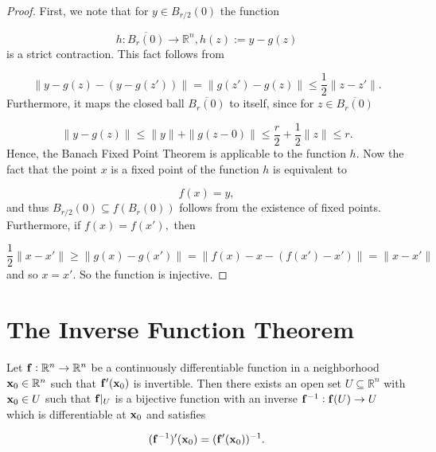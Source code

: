 \begin{proof}
First, we note that for \(y \in B_{r/2}(0)\) the function

\[h: \overline{B_r(0)} \to \mathbb R^n, h(z) := y - g(z)\] is a strict
contraction. This fact follows from

\[\|y - g(z) - (y - g(z'))\| = \|g(z') - g(z)\| \le \frac{1}{2}\|z - z'\|.\]
Furthermore, it maps the closed ball  \(\overline{B_r(0)}\) to itself, since for
\(z \in \overline{B_r(0)}\)

\[\|y - g(z)\| \le \|y\| + \|g(z - 0)\| \le \frac{r}{2} + \frac{1}{2}\|z\| \le r.\]
Hence, the Banach Fixed Point Theorem is applicable to the function \(h\). Now  the fact that the point \(x\)
is a fixed point of the function  \(h\) is equivalent to

\[f(x) = y,\] and thus \(B_{r/2}(0) \subseteq f(B_r(0))\) follows from
the existence of fixed points. Furthermore, if \(f(x) = f(x'),\) then

\[\frac{1}{2} \|x - x'\| \ge \|g(x) - g(x')\| = \|f(x) - x - (f(x') - x')\| = \|x - x'\|\]
and so \(x = x'\). So  the function is injective.
\end{proof}


\section{The Inverse Function Theorem}\label{the-inverse-function-theorem}

\begin{thm}
Let \(\mathbf{ f}: \mathbb R^n \to \mathbb R^n\) be a continuously differentiable function  in a neighborhood \(\mathbf{ x}_0 \in \mathbb R^n\)
such that \(\mathbf{ f}'(\mathbf{ x}_0)\) is invertible. Then there exists an open set
\(U \subseteq \mathbb R^n\) with \(\mathbf{ x}_0 \in U\) such that \(\mathbf{ f}|_U\) is a
bijective function with an inverse \(\mathbf{ f}^{-1} : \mathbf{ f}(U) \to U\) which is
differentiable at \(\mathbf{ x}_0\) and satisfies

\[(\mathbf{ f}^{-1})'(\mathbf{ x}_0) = (\mathbf{ f}'(\mathbf{ x}_0))^{-1}.\]
\end{thm}



